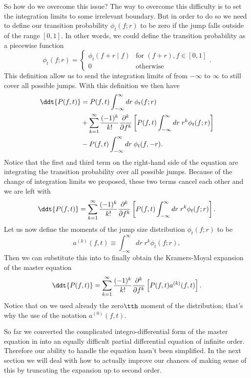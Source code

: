 So how do we overcome this issue? The way to overcome this difficulty is to
set the integration limits to some irrelevant boundary. But in order to do so
we need to define our transition probability $\phi_t(f; r)$ to be zero if the
jump falls outside of the range $[0, 1]$. In other words, we could define the
transition probability as a piecewise function
\begin{equation}
  \phi_t(f; r) =
  \begin{cases}
    \phi_t(f + r \mid f)& \text{for } (f + r), f \in [0, 1] \\
    0& \text{otherwise}
  \end{cases}.
\end{equation}
This definition allow us to send the integration limits of
 from $-\infty$ to $\infty$ to still cover all possible
jumps. With this definition we then have
\begin{equation}
  \begin{split}
    \ddt{P(f, t)} &= P(f, t)\int^\infty_{- \infty} dr \; \phi_t(f; r) \\
    &+
    \sum_{k=1}^\infty {(-1)^k \over k!} {\partial^k \over \partial f^k}
    \left[
    P(f, t) \int_{-\infty}^\infty dr \; r^k \phi_t(f; r)
    \right] \\
    &-
    P(f, t) \int_{-\infty}^\infty dr \; \phi_t(f, -r).
  \end{split}
\end{equation}
Notice that the first and third term on the right-hand side of the equation are
integrating the transition probability over all possible jumps. Because of the
change of integration limits we proposed, these two terms cancel each other and
we are left with
\begin{equation}
  \ddt{P(f, t)} = \sum_{k=1}^\infty {(-1)^k \over k!}
  {\partial^k \over \partial f^k}
  \left[
  P(f, t) \int_{-\infty}^\infty dr \; r^k \phi_t(f; r)
  \right].
  \label{eq_almost_km}
\end{equation}
Let us now define the moments of the jump size distribution $\phi_t(f; r)$ to be
\begin{equation}
  a^{(k)}(f, t) \equiv \int_{-\infty}^\infty dr \; r^k \phi_t(f; r),
  \label{eq_jump_mom}
\end{equation}
Then we can substitute this into  to finally obtain the
Kramers-Moyal expansion of the master equation
\begin{equation}
  \ddt{P(f, t)} = \sum_{k=1}^\infty {(-1)^k \over k!}
  {\partial^k \over \partial f^k}
  \left[
  P(f, t) a^{(k)}(f, t)
  \right].
  \label{eq_km_expansion}
\end{equation}
Notice that on  we used already the zero$\tth$
moment of the distribution; that's why the use of the notation $a^{(0)}(f, t)$.

So far we converted the complicated integro-differential form of the master
equation in  into an equally difficult partial
differential equation of infinite order. Therefore our ability to handle the
equation hasn't been simplified. In the next section we will deal with how to
actually improve our chances of making sense of this by truncating the expansion
up to second order.
